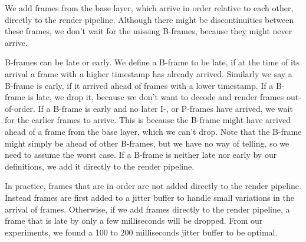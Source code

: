 We add frames from the base layer, which arrive in order relative to each other, directly to the render pipeline. Although there might be discontinuities between these frames, we don't wait for the missing B-frames, because they might never arrive.

B-frames can be late or early. We define a B-frame to be late, if at the time of its arrival a frame with a higher timestamp has already arrived. Similarly we say a B-frame is early, if it arrived ahead of frames with a lower timestamp. If a B-frame is late, we drop it, because we don't want to decode and render frames out-of-order. If a B-frame is early and no later I-, or P-frames have arrived, we wait for the earlier frames to arrive. This is because the B-frame might have arrived ahead of a frame from the base layer, which we can't drop. Note that the B-frame might simply be ahead of other B-frames, but we have no way of telling, so we need to assume the worst case. If a B-frame is neither late nor early by our definitions, we add it directly to the render pipeline. 

In practice, frames that are in order are not added directly to the render pipeline. Instead frames are first added to a jitter buffer to handle small variations in the arrival of frames. Otherwise, if we add frames directly to the render pipeline, a frame that is late by only a few milliseconds will be dropped. From our experiments, we found a 100 to 200 milliseconds jitter buffer to be optimal. %

